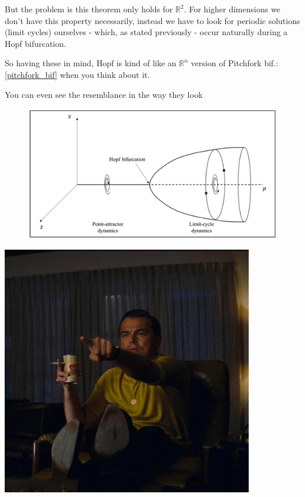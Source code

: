 But the problem is this theorem only holds for $\mathbb{R}^2$. For higher dimensions we don't have this property necessarily, instead we have to look for periodic solutions (limit cycles) ourselves - which, as stated previously - occur naturally during a Hopf bifurcation.

So having these in mind, Hopf is kind of like an $\mathbb{R}^n$ version of Pitchfork bif.: \ref{pitchfork_bif} when you think about it.

You can even see the resemblance in the way they look

\begin{figure}[H]
	\includegraphics[width=13cm]{math_pics/hopf-bif-pic.png}
	\centering
\end{figure}

\includegraphics[width=11cm]{math_pics/leo.jpg}

